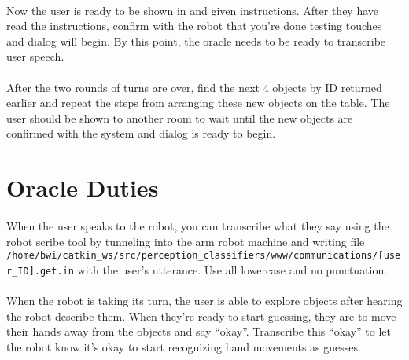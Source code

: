 \documentclass{article}
\begin{document}
\paragraph{} Now the user is ready to be shown in and given instructions. After they have read the instructions, confirm with the robot that you're done testing touches and dialog will begin. By this point, the oracle needs to be ready to transcribe user speech.

\paragraph{} After the two rounds of turns are over, find the next 4 objects by ID returned earlier and repeat the steps from arranging these new objects on the table. The user should be shown to another room to wait until the new objects are confirmed with the system and dialog is ready to begin.

\section{Oracle Duties}

\paragraph{} When the user speaks to the robot, you can transcribe what they say using the robot scribe tool by tunneling into the arm robot machine and writing file \texttt{/home/bwi/catkin\_ws/src/perception\_classifiers/www/communications/[user\_ID].get.in} with the user's utterance. Use all lowercase and no punctuation.

\paragraph{} When the robot is taking its turn, the user is able to explore objects after hearing the robot describe them. When they're ready to start guessing, they are to move their hands away from the objects and say ``okay''. Transcribe this ``okay'' to let the robot know it's okay to start recognizing hand movements as guesses.
\end{document}
